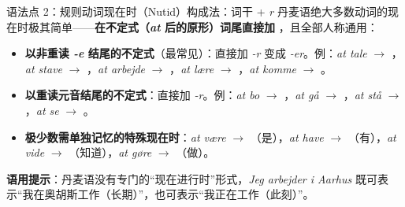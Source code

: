 \begin{grammatikbox}{语法点 2：规则动词现在时（Nutid）构成法：词干 + \textit{r}}
丹麦语绝大多数动词的现在时极其简单——\textbf{在不定式（\textit{at} 后的原形）词尾直接加 }，且全部人称通用：
\begin{itemize}
  \item \textbf{以非重读 \textit{-e} 结尾的不定式}（最常见）：直接加 \textit{-r} 变成 \textit{-er}。\newline 例：\textit{at tale} $\rightarrow$ ，\textit{at stave} $\rightarrow$ ，\textit{at arbejde} $\rightarrow$ ，\textit{at lære} $\rightarrow$ ，\textit{at komme} $\rightarrow$ 。
  \item \textbf{以重读元音结尾的不定式}：直接加 \textit{-r}。\newline 例：\textit{at bo} $\rightarrow$ ，\textit{at gå} $\rightarrow$ ，\textit{at stå} $\rightarrow$ ，\textit{at se} $\rightarrow$ 。
  \item \textbf{极少数需单独记忆的特殊现在时}：\textit{at være} $\rightarrow$ （是），\textit{at have} $\rightarrow$ （有），\textit{at vide} $\rightarrow$ （知道），\textit{at gøre} $\rightarrow$ （做）。
\end{itemize}
\textbf{语用提示}：丹麦语没有专门的“现在进行时”形式，\textit{Jeg arbejder i Aarhus} 既可表示“我在奥胡斯工作（长期）”，也可表示“我正在工作（此刻）”。
\end{grammatikbox}

